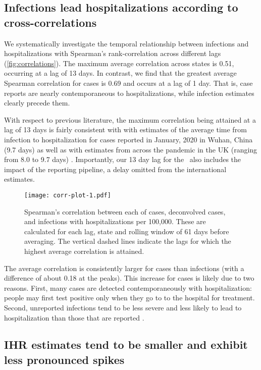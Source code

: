 \subsection{Infections lead hospitalizations according to cross-correlations}
\label{sec:lagged-correlations}

We systematically investigate the temporal relationship between infections and
hospitalizations with Spearman's rank-correlation across different lags
(\autoref{fig:correlations}). The maximum average correlation across states is
0.51, occurring at a lag of 13 days. In contrast, we find that the greatest
average Spearman correlation for cases is 0.69 and occurs at a lag of 1 day.
That is, case reports are nearly contemporaneous to hospitalizations, while
infection estimates clearly precede them. 

With respect to previous literature, 
the maximum correlation being attained at a lag of 13 days is fairly consistent with
with estimates of the average time from infection to
hospitalization for cases reported in January, 2020 in Wuhan, China (9.7 days)
as well as with estimates from across the pandemic in the UK (ranging from 8.0
to 9.7 days) \citep{linton2020incubation, ward2021understanding}. 
Importantly, our 13 day lag for the
\US\ also includes the impact of the reporting pipeline, a delay omitted from
the international estimates. 

\begin{figure}[!tb]
\centering
\texttt{[image: corr-plot-1.pdf]} 
\caption{Spearman's correlation between each of cases, deconvolved cases, and
infections with hospitalizations per 100,000. These are calculated for each lag,
state and rolling window of 61 days before averaging. The vertical dashed lines
indicate the lags for which the highest average correlation is attained.}
\label{fig:correlations}
\end{figure}
    

The average correlation is consistently larger for cases than infections 
(with a difference of about 0.18 at the peaks). 
This increase for cases is likely due to two reasons. First, many cases are
detected contemporaneously with hospitalization: people may first test
positive only when they go to to the hospital for treatment. Second, unreported
infections tend to be less severe and less likely to lead to hospitalization
than those that are reported \citep{sallahi2021using}.



\subsection{IHR estimates tend to be smaller and exhibit less pronounced spikes}
\label{sec:ihrs}

